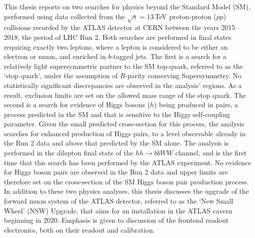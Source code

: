 This thesis reports on two searches for physics beyond the Standard Model (SM), performed using data collected from
the $\sqrt{s}=13$\,TeV proton-proton ($pp$) collisions recorded
by the ATLAS detector at CERN between the years 2015--2018, the period of LHC Run 2.
Both searches are performed in final states requiring exactly two leptons, where a lepton
is considered to be either an electron or muon, and enriched in $b$-tagged jets.
The first is a search for a relatively light supersymmetric partner to the SM
top-quark, referred to as the `stop quark', under the assumption of $R$-parity conserving Supersymmetry.
No statistically significant discrepancies are observed in the analysis' regions.
As a result, exclusion limits are set on the allowed mass range of the stop quark.
The second is a search for evidence of Higgs bosons ($h$) being produced in pairs, a process
predicted in the SM and that is sensitive to the Higgs
self-coupling parameter.
Given the small predicted cross-section for this process, the analysis searches for enhanced production
of Higgs pairs, to a level observable already in the Run 2 data and above that predicted by the SM alone.
The analysis is performed in the dilepton final state of the $hh \rightarrow bbWW$ channel, and is the first time that
this search has been performed by the ATLAS experiment.
No evidence for Higgs boson pairs are observed in the Run 2 data and
upper limits are therefore set on the cross-section of the SM Higgs boson pair production process.
In addition to these two physics analyses, this thesis discusses the upgrade of the forward
muon system of the ATLAS detector, referred to as the `New Small Wheel' (NSW) Upgrade,
that aims for an installation in the ATLAS cavern beginning in 2020.
Emphasis is given to discussion of the frontend readout electronics, both on their readout and calibration.
